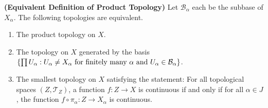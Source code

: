 \documentclass{report}
\begin{document}
\begin{theorem}
\textbf{(Equivalent Definition of Product Topology)} Let $\mathcal{B}_\alpha $ each be the subbase of $X_\alpha $. The following topologies are equivalent.
\begin{enumerate}[label=(\alph*)]
    \item The product topology on $X$.
    \item The topology on $X$ generated by the basis $\{ \prod U_\alpha : U_\alpha \neq X_\alpha \text{ for finitely many } \alpha \text{ and } U_\alpha \in \mathcal{B}_\alpha \}$.
    \item The smallest topology on $X$ satisfying the statement: For all topological spaces $(Z, \mathscr{T}_Z)$, a function $f : Z \to X$ is continuous if and only if for all $\alpha \in J$, the function $f \circ \pi_\alpha : Z \to X_\alpha$ is continuous.
\end{enumerate}
\end{theorem}
\end{document}
